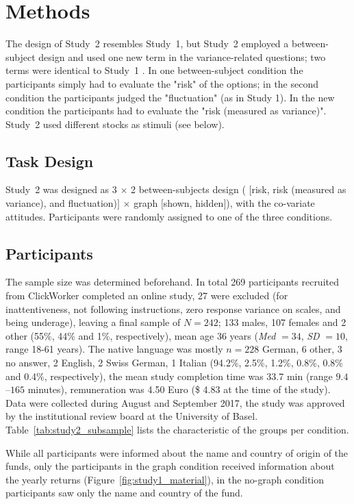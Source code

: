 \documentclass[a4paper,man, natbib,floatsintext]{apa6} %
\begin{document}
\section{Methods}
The design of Study~2 resembles Study~1, but Study~2 employed a between-subject design and used one new term in the variance-related questions; two terms were identical to Study~1 . In one between-subject condition the participants simply had to evaluate the "risk" of the options; in the second condition the participants judged the "fluctuation" (as in Study 1). In the new condition the participants had to evaluate the "risk (measured as variance)". Study~2 used different stocks as stimuli (see below).

\subsection{Task Design}
Study~2 was designed as 3 $\times$ 2 between-subjects design ( $[$risk, risk (measured as variance), and fluctuation)$]$ $\times$ graph $[$shown, hidden$]$), with the co-variate attitudes. Participants were randomly assigned to one of the three conditions.

\subsection{Participants}
The sample size was determined beforehand. In total 269 participants recruited from ClickWorker completed an online study, 27 were excluded (for inattentiveness, not following instructions, zero response variance on scales, and being underage), leaving a final sample of $N = 242$; 133 males, 107 females and 2 other (55\%, 44\% and 1\%, respectively), mean age 36 years (\textit{Med} $ = 34$, \textit{SD} $= 10$, range 18-61 years). The native language was mostly $n = 228$ German, 6 other, 3 no answer, 2 English, 2 Swiss German,  1 Italian (94.2\%, 2.5\%, 1.2\%, 0.8\%, 0.8\% and 0.4\%, respectively), the mean study completion time was 33.7 min (range $9.4$--$165$ minutes), remuneration was 4.50 Euro (\$ 4.83 at the time of the study). Data were collected during August and September 2017, the study was approved by the institutional review board at the University of Basel. Table~\ref{tab:study2_subsample} lists the characteristic of the groups per condition.

While all participants were informed about the name and country of origin of the funds, only the participants in the graph condition received information about the yearly returns (Figure~\ref{fig:study1_material}), in the no-graph condition participants saw only the name and country of the fund. 
\end{document}
